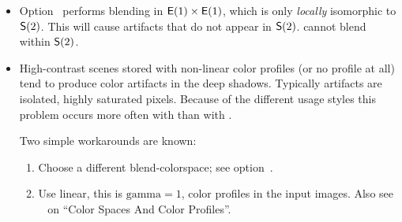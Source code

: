\begin{itemize}
\item
  Option~ performs blending in $\mathsf{E}(1) \times \mathsf{E}(1)$,
  which is only \emph{locally} isomorphic to $\mathsf{S}(2)$.  This will cause artifacts
  that do not appear in $\mathsf{S}(2)$.  \App{} cannot blend within $\mathsf{S}(2)$.
\fi%

%
%
%
\item
  High-contrast scenes stored with non-linear color profiles (or no profile at all) tend to
  produce color artifacts in the deep shadows.  Typically artifacts are isolated, highly
  saturated pixels.  Because of the different usage styles this problem occurs more often with
   than with .

  Two simple workarounds are known:
  \begin{enumerate}
  \item
    Choose a different blend-colorspace; see
    option~.

  \item
    Use linear, this is $\mathrm{gamma} = 1$, color profiles in the input images.  Also see
    \chapterName~ on ``Color Spaces And Color Profiles''.
  \end{enumerate}
\end{itemize}



